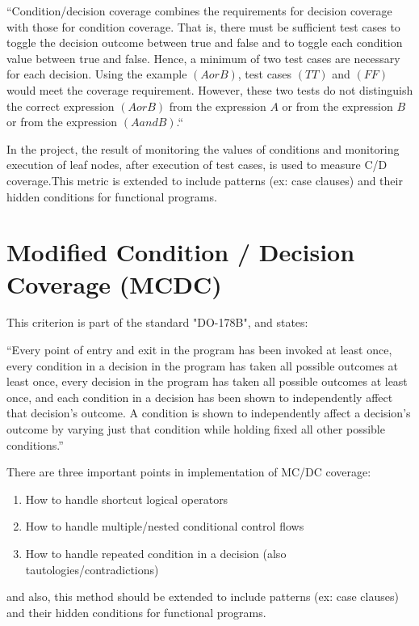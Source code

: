 \documentclass[12pt,a4paper]{report}
\begin{document}
“Condition/decision coverage combines the requirements for decision coverage with those for condition coverage. That is, there must be sufficient test cases
 to toggle the decision outcome between true and false and to toggle each condition value between true and false. Hence, a minimum of two test cases are
 necessary for each decision. Using the example $(A or B)$, test cases $(TT)$ and $(FF)$ would meet the coverage requirement. However, these two tests do
 not distinguish the correct expression $(A or B)$ from the expression $A$ or from the expression $B$ or from the expression $(A and B)$.“
\cite{KellyJ.:2001:PTM:886632} 

In the project, the result of monitoring the values of conditions and monitoring execution of leaf nodes, after execution of test cases, is used to
 measure C/D coverage.This metric is extended to include patterns (ex: case clauses) and their hidden conditions for functional programs.

\section{Modified Condition / Decision Coverage (MCDC)}
This criterion is part of the standard "DO-178B", and states:

“Every point of entry and exit in the program has been invoked at least once, every condition in a decision in the program has taken all possible outcomes
 at least once, every decision in the program has taken all possible outcomes at least once, and each condition in a decision has been shown to
 independently affect that decision's outcome. A condition is shown to independently affect a decision's outcome by varying just that condition while
 holding fixed all other possible conditions.”\cite{cast-10}

There are three important points in implementation of MC/DC coverage:

\begin{enumerate}
 \item How to handle shortcut logical operators
 \item How to handle multiple/nested conditional control flows
 \item How to handle repeated condition in a decision (also tautologies/contradictions)
\end{enumerate}
 
and also, this method should be extended to include patterns (ex: case clauses) and their hidden conditions for functional programs.
\end{document}
